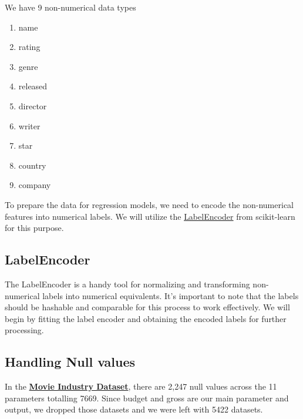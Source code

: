 \documentclass[conference]{IEEEtran}
\begin{document}
        We have 9 non-numerical data types
        \begin{enumerate}
            \item name
            \item rating
            \item genre
            \item released
            \item director
            \item writer
            \item star
            \item country
            \item company
        \end{enumerate}
        
        To prepare the data for regression models, we need to encode the non-numerical features into numerical labels. We will utilize the \href{https://scikit-learn.org/stable/modules/generated/sklearn.preprocessing.LabelEncoder.html}{LabelEncoder} from scikit-learn for this purpose.
        
        \subsection*{LabelEncoder}
            The LabelEncoder is a handy tool for normalizing and transforming non-numerical labels into numerical equivalents. It's important to note that the labels should be hashable and comparable for this process to work effectively. We will begin by fitting the label encoder and obtaining the encoded labels for further processing.
            
        \subsection*{Handling Null values}
            In the \href{https://www.kaggle.com/datasets/danielgrijalvas/movies}{\textbf{Movie Industry Dataset}}, there are 2,247 null values across the 11 parameters totalling 7669.
            Since budget and gross are our main parameter and output, we dropped those datasets and we were left with 5422 datasets.
            
\end{document}
